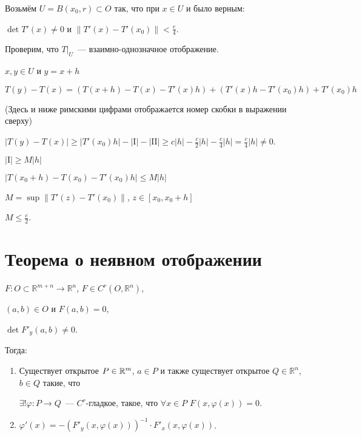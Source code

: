 \documentclass{article}
\begin{document}
            Возьмём $U = B(x_0, r) \subset O$ так, что при $x \in U$ и было верным:
            
                $\det T'(x) \neq 0$ и $\| T'(x) - T'(x_0) \| < \frac{c}{4}$.
                
            Проверим, что $T \big|_U$~--- взаимно-однозначное отображение.
            
            $x, y \in U$ и $y = x + h$
            
            $T(y) - T(x) = \left( T(x + h) - T(x) - T'(x) h \right) + \left( T'(x)h - T'(x_0)h \right) + T'(x_0)h$
        
            (Здесь и ниже римскими цифрами отображается номер скобки в выражении сверху)
            
            $\left| T(y) - T(x) \right| \geq \left| T'(x_0) h \right| - | \mathrm{I} | - | \mathrm{II} | \geq c |h| - \frac{c}{2} |h| - \frac{c}{4} |h| = \frac{c}{4} |h| \neq 0$.
            
            $| \mathrm{I} | \geq M |h|$
            
            $\left| T(x_0 + h) - T(x_0) - T'(x_0) h     \right| \leq M |h|$
            
            $M = \sup \| T'(z) - T'(x_0) \|$, $z \in [x_0, x_0 + h]$
            
            $M \leq \frac{c}{2}$.
            
    \newpage
    
    \section{Теорема о неявном отображении}
    
        $F : O \subset \mathbb{R}^{m + n} \rightarrow \mathbb{R}^n$, $F \in C^r \left( O, \mathbb{R}^n \right)$,
        
        $(a, b) \in O$ и $F(a, b) = 0$,
        
        $\det F'_y (a, b) \neq 0$.
        
        Тогда:
        
        \begin{enumerate}
        
            \item Существует открытое $P \in \mathbb{R}^m$, $a \in P$ и также существует открытое $Q \in \mathbb{R}^n$, $b \in Q$ такие, что
            
                $\exists ! \varphi : P \rightarrow Q$~--- $C^r$-гладкое, такое, что $\forall x \in P$ $F(x, \varphi(x)) = 0$.
                
            \item $\varphi'(x) = - \left(F'_y (x, \varphi(x)) \right)^{-1} \cdot F'_x (x, \varphi(x))$.
    
        \end{enumerate}
        
\end{document}
